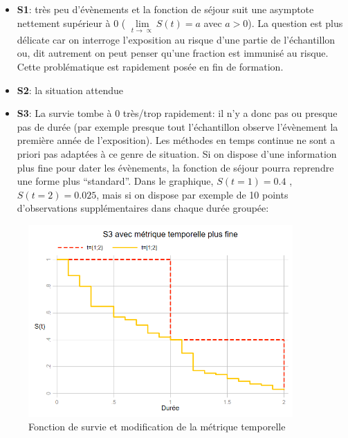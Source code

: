 \documentclass[
  12pt,
  letterpaper,
  DIV=11,
  numbers=noendperiod,
  onepage,
  openany]{scrreprt}
\begin{document}
\begin{itemize}
\item
  \textbf{S1}: très peu d'évènements et la fonction de séjour suit une
  asymptote nettement supérieur à 0 (
  \(\lim\limits_{t\to{\propto}}S(t)=a\) avec \(a>0\)). La question est
  plus délicate car on interroge l'exposition au risque d'une partie de
  l'échantillon ou, dit autrement on peut penser qu'une fraction est
  immunisé au risque. Cette problématique est rapidement posée en fin de
  formation.
\item
  \textbf{S2}: la situation attendue
\item
  \textbf{S3}: La survie tombe à 0 très/trop rapidement: il n'y a donc
  pas ou presque pas de durée (par exemple presque tout l'échantillon
  observe l'évènement la première année de l'exposition). Les méthodes
  en temps continue ne sont a priori pas adaptées à ce genre de
  situation. Si on dispose d'une information plus fine pour dater les
  évènements, la fonction de séjour pourra reprendre une forme plus
  ``standard''. Dans le graphique, \(S(t=1)=0.4\) , \(S(t=2)=0.025\),
  mais si on dispose par exemple de 10 points d'observations
  supplémentaires dans chaque durée groupée:
\end{itemize}

\begin{figure}

\caption{Fonction de survie et modification de la métrique temporelle}

{\centering \includegraphics[width=0.9\textwidth,height=\textheight]{images/Image5c.png}

}

\end{figure}
\end{document}
